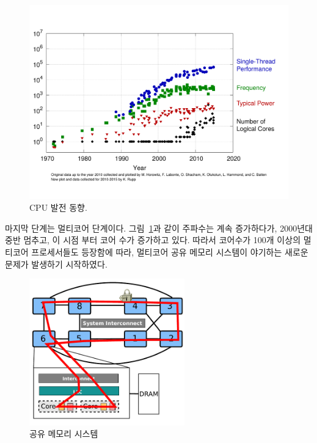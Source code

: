 \begin{figure}[h!]
  \begin{center}
    \includegraphics[scale=0.3]{fig/cpu}
  \end{center}
  \caption{CPU 발전 동향.}
  \label{fig:aim7}
\end{figure}

마지막 단계는 멀티코어 단계이다.
그림~\ref{fig:aim7}과 같이 주파수는 계속 증가하다가, 2000년대 중반 멈추고, 이 시점 부터 코어 수가 증가하고 있다. 
따라서 코어수가 100개 이상의 멀티코어 프로세서들도 등장함에 따라, 멀티코어 공유 
메모리 시스템이 야기하는 새로운 문제가 발생하기 시작하였다.

\begin{figure}[h!]
    \centering
    \includegraphics[width=0.6\textwidth]{fig/archcache}
    \caption{공유 메모리 시스템}
  \label{shared_memory}
\end{figure}

